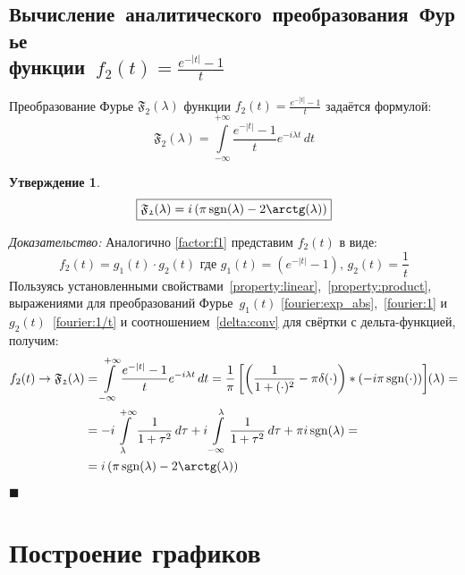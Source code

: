\documentclass[11pt, oneside, final]{article}
\numberwithin{equation}{section}
\newtheorem*{statement}{Утверждение}
\renewenvironment{proof}{
\noindent\textit{Доказательство: }} {\qed}
\newcommand \rarrow{\rightarrow}
\newcommand \intinf[1][{\,dt}]{ \int\limits_{-\infty}^{+\infty}{{#1}}}
\renewcommand \qed{$\blacksquare$}
\DeclareMathOperator{\sgn}{sgn}
\begin{document}
    \subsection{Вычисление~аналитического~преобразования~Фурье\\функции~\(f_2(t) = \frac{e^{-|t|} - 1}{t} \)}
    Преобразование Фурье \( \mathfrak{F_2} (\lambda)\) функции \(f_2(t) = \frac{e^{-|t|} - 1}{t} \) задаётся формулой:
    \[ \mathfrak{F_2} (\lambda) = \intinf[{\dfrac{e^{-|t|} - 1}{t} e^{-i\lambda t}\, dt}] \]
    \begin{statement}
        \begin{equation}\label{eq:fourier:f2} 
            \boxed{ \mathfrak{F_2}(\lambda) = i\left(\pi\sgn(\lambda) - 2\arctg(\lambda)\right) } 
        \end{equation}
    \end{statement}
    \begin{proof}
        Аналогично \eqref{factor:f1} представим \(f_2(t) \) в виде: 
        \begin{equation}\label{factor:f2} 
            f_2(t) = g_1(t) \cdot g_2(t) \text{ где } g_1(t) = \left(e^{-|t|} - 1\right)\text{, } g_2(t) = \dfrac{1}{t} 
        \end{equation}
        Пользуясь установленными свойствами~\ref{property:linear},~\ref{property:product}, выражениями для преобразований Фурье~\(g_1(t)\) \eqref{fourier:exp_abs},~\eqref{fourier:1} и~\(g_2(t)\)~\eqref{fourier:1/t} и соотношением~\eqref{delta:conv} для свёртки с дельта-функцией, получим:
        \[ 
        \begin{split} 
            f_2(t) \rarrow \mathfrak{F_2} (\lambda) &= \intinf[{ \dfrac{e^{-|t|} - 1}{t} e^{-i\lambda t}\, dt}] = 
            \dfrac{1}{\pi}\left[\left({\dfrac{1}{1 + (\cdot)^2} - \pi\delta(\cdot)}\right) * \left({-i \pi \sgn(\cdot)}\right)\right] \negmedspace({\lambda}) = \\
            &= -i\int\limits_{\lambda}^{+\infty}{\dfrac{1}{1 + \tau^2}\, d\tau} + i\int\limits_{-\infty}^{\lambda}{\dfrac{1}{1 + \tau^2}\, d\tau} + \pi i \sgn(\lambda) = \\
            &= i\left(\pi \sgn(\lambda) - 2\arctg(\lambda)\right) 
        \end{split}
        \]
    \end{proof}
    \clearpage
    \section{Построение графиков} %
    \label{sec:plotting}
\end{document}
